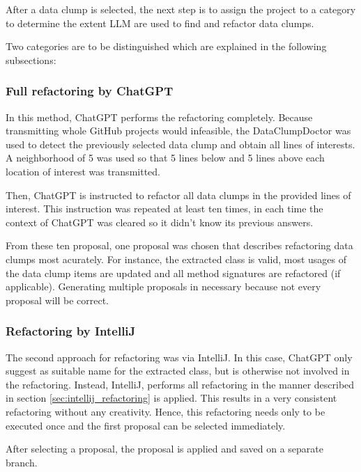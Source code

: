 After a data clump is selected, the next step is to assign the project to a category to determine the extent \acs{LLM} are used to find and refactor data clumps. 

Two categories are to be distinguished which are explained in the following subsections:

\subsubsection{Full refactoring by ChatGPT}
In this method, ChatGPT performs the refactoring completely. Because transmitting whole GitHub projects would infeasible, the DataClumpDoctor was used to detect the previously selected data clump and obtain all lines of interests. A neighborhood of 5 was used so that 5 lines below and 5 lines above each location of interest was transmitted. 

Then, ChatGPT is instructed to refactor all data clumps in the provided lines of interest. This instruction was repeated at least ten times, in each time the context of ChatGPT was cleared so it didn't know its previous answers. 

From these ten proposal, one proposal was chosen that describes refactoring data clumps most acurately. For instance, the extracted class is valid, most usages of the data clump items are updated and all method signatures are refactored (if applicable). Generating multiple proposals in necessary because not every proposal will be correct.

\subsubsection{Refactoring by IntelliJ}

The second approach for refactoring was via IntelliJ. In this case, ChatGPT only suggest as suitable name for the extracted class, but is otherwise not involved in the refactoring. Instead, IntelliJ, performs all refactoring in the manner described in section  \ref{sec:intellij_refactoring} is applied. This results in a very consistent refactoring without any creativity. Hence, this refactoring needs only to be executed once and the first proposal can be selected immediately. 

After selecting a proposal, the proposal is applied and saved on a separate branch.

